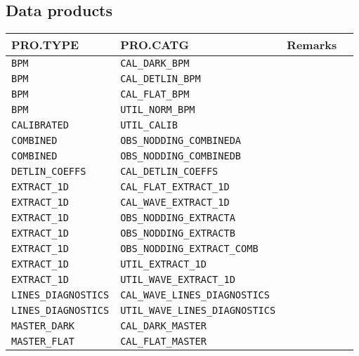 \subsection{Data products}
\label{sec:data-prods}
\begin{tabularx}{\linewidth}{|X|X|X|X|}
    \hline
    \multicolumn{1}{|l|}{\textbf{PRO.TYPE}} &
    \multicolumn{1}{l|}{\textbf{PRO.CATG}} &
    \multicolumn{1}{l|}{\textbf{Remarks}} \\
    \hline
\texttt{BPM              } & \texttt{CAL\_DARK\_BPM}                & \\
\texttt{BPM              } & \texttt{CAL\_DETLIN\_BPM}              & \\
\texttt{BPM              } & \texttt{CAL\_FLAT\_BPM}                & \\
\texttt{BPM              } & \texttt{UTIL\_NORM\_BPM}               & \\
\texttt{CALIBRATED       } & \texttt{UTIL\_CALIB}                  & \\
\texttt{COMBINED         } & \texttt{OBS\_NODDING\_COMBINEDA}       & \\
\texttt{COMBINED         } & \texttt{OBS\_NODDING\_COMBINEDB}       & \\
\texttt{DETLIN\_COEFFS    } & \texttt{CAL\_DETLIN\_COEFFS}           & \\
\texttt{EXTRACT\_1D       } & \texttt{CAL\_FLAT\_EXTRACT\_1D}         & \\
\texttt{EXTRACT\_1D       } & \texttt{CAL\_WAVE\_EXTRACT\_1D}         & \\
\texttt{EXTRACT\_1D       } & \texttt{OBS\_NODDING\_EXTRACTA}        & \\
\texttt{EXTRACT\_1D       } & \texttt{OBS\_NODDING\_EXTRACTB}        & \\
\texttt{EXTRACT\_1D       } & \texttt{OBS\_NODDING\_EXTRACT\_COMB}    & \\
\texttt{EXTRACT\_1D       } & \texttt{UTIL\_EXTRACT\_1D}             & \\
\texttt{EXTRACT\_1D       } & \texttt{UTIL\_WAVE\_EXTRACT\_1D}        & \\
\texttt{LINES\_DIAGNOSTICS} & \texttt{CAL\_WAVE\_LINES\_DIAGNOSTICS}  & \\
\texttt{LINES\_DIAGNOSTICS} & \texttt{UTIL\_WAVE\_LINES\_DIAGNOSTICS} & \\
\texttt{MASTER\_DARK      } & \texttt{CAL\_DARK\_MASTER}             & \\
\texttt{MASTER\_FLAT      } & \texttt{CAL\_FLAT\_MASTER}             & \\

\end{tabularx}
